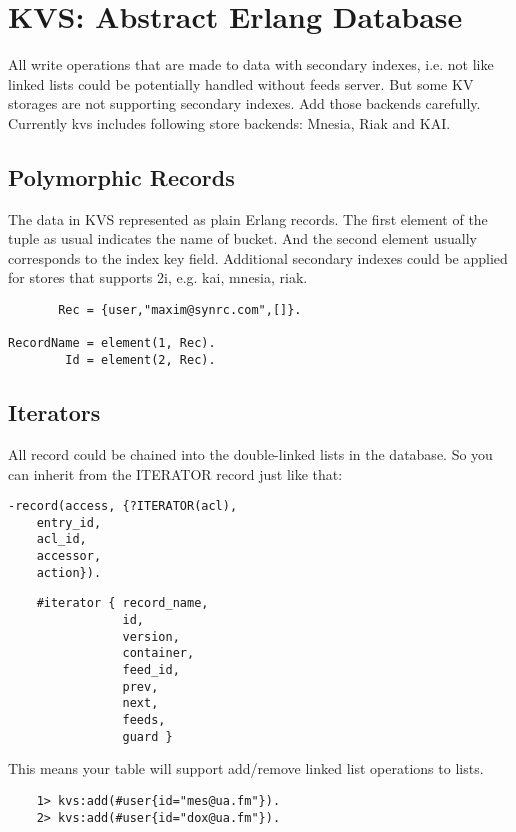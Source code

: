 \section{KVS: Abstract Erlang Database}

All write operations that are made to data with secondary indexes,
i.e. not like linked lists could be potentially handled without
feeds server. But some KV storages are not supporting secondary
indexes. Add those backends carefully. Currently kvs includes
following store backends: Mnesia, Riak and KAI.

\subsection{Polymorphic Records}

The data in KVS represented as plain Erlang records.
The first element of the tuple as usual indicates the name of bucket.
And the second element usually corresponds to the index key field.
Additional secondary indexes could be applied for stores that
supports 2i, e.g. kai, mnesia, riak.

\begin{lstlisting}
       Rec = {user,"maxim@synrc.com",[]}.

RecordName = element(1, Rec).
        Id = element(2, Rec).
\end{lstlisting}

\subsection{Iterators}

All record could be chained into the double-linked lists in the database.
So you can inherit from the ITERATOR record just like that:

\begin{lstlisting}
-record(access, {?ITERATOR(acl),
    entry_id,
    acl_id,
    accessor,
    action}).
\end{lstlisting}

\begin{lstlisting}
    #iterator { record_name,
                id,
                version,
                container,
                feed_id,
                prev,
                next,
                feeds,
                guard }
\end{lstlisting}

This means your table will support add/remove linked list operations to lists.

\begin{lstlisting}
    1> kvs:add(#user{id="mes@ua.fm"}).
    2> kvs:add(#user{id="dox@ua.fm"}).
\end{lstlisting}

